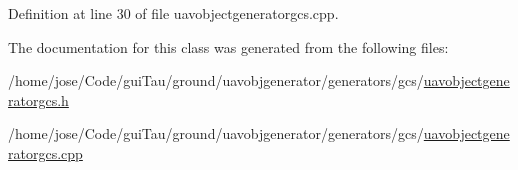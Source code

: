 Definition at line 30 of file uavobjectgeneratorgcs.\-cpp.



The documentation for this class was generated from the following files\-:\begin{DoxyCompactItemize}
\item 
/home/jose/\-Code/gui\-Tau/ground/uavobjgenerator/generators/gcs/\hyperlink{uavobjectgeneratorgcs_8h}{uavobjectgeneratorgcs.\-h}\item 
/home/jose/\-Code/gui\-Tau/ground/uavobjgenerator/generators/gcs/\hyperlink{uavobjectgeneratorgcs_8cpp}{uavobjectgeneratorgcs.\-cpp}\end{DoxyCompactItemize}

